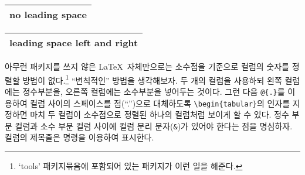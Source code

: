 
\begin{example}
\begin{tabular}{@{} l @{}}
\hline
no leading space\\
\hline
\end{tabular}
\end{example}

\vspace{-.5\onelineskip}

\begin{example}
\begin{tabular}{l}
\hline
leading space left and right\\
\hline
\end{tabular}
\end{example}


아무런 패키지를 쓰지 않은 \LaTeX\ 자체만으로는 소수점을 기준으로 컬럼의 숫자를 정렬할 방법이 없다.\footnote{%
  `tools' 패키지묶음에 포함되어 있는  패키지가 이런 일을 해준다.
}
``변칙적인'' 방법을 생각해보자. 두 개의 컬럼을 사용하되 왼쪽 컬럼에는 정수부분을, 오른쪽 컬럼에는 소수부분을 넣어두는 것이다.
그런 다음 \verb|@{.}|를 이용하여 컬럼 사이의 스페이스를 점(``.'')으로 대체하도록 \verb|\begin{tabular}|의 인자를
  지정하면 마치 두 컬럼이 소수점으로 정렬된 하나의 컬럼처럼 보이게 할 수 있다.
정수 부분 컬럼과 소수 부분 컬럼 사이에 컬럼 분리 문자(\verb|&|)가 있어야 한다는 점을 명심하자.
컬럼의 제목줄은  명령을 이용하여 표시한다.

